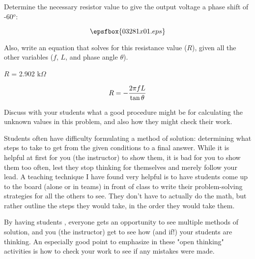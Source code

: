

Determine the necessary resistor value to give the output voltage a phase shift of -60$^{o}$:

$$\epsfbox{03281x01.eps}$$

Also, write an equation that solves for this resistance value ($R$), given all the other variables ($f$, $L$, and phase angle $\theta$).







$R$ = 2.902 k$\Omega$

$$R = - {{2 \pi f L} \over {\tan \theta}}$$







Discuss with your students what a good procedure might be for calculating the unknown values in this problem, and also how they might check their work.

\vskip 10pt

Students often have difficulty formulating a method of solution: determining what steps to take to get from the given conditions to a final answer.  While it is helpful at first for you (the instructor) to show them, it is bad for you to show them too often, lest they stop thinking for themselves and merely follow your lead.  A teaching technique I have found very helpful is to have students come up to the board (alone or in teams) in front of class to write their problem-solving strategies for all the others to see.  They don't have to actually do the math, but rather outline the steps they would take, in the order they would take them.

By having students , everyone gets an opportunity to see multiple methods of solution, and you (the instructor) get to see how (and if!) your students are thinking.  An especially good point to emphasize in these "open thinking" activities is how to check your work to see if any mistakes were made.




